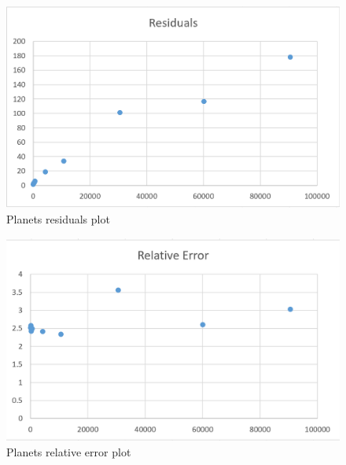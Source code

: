 \documentclass[12pt]{extarticle}
\begin{document}
\begin{figure}[ht!]
  \includegraphics[width=\linewidth]{PlanetsResiduals.PNG}
  \caption{Planets residuals plot}
\end{figure}
\begin{figure}[ht!]
  \includegraphics[width=\linewidth]{PlanetsRelativeError.PNG}
  \caption{Planets relative error plot}
\end{figure}
\end{document}
